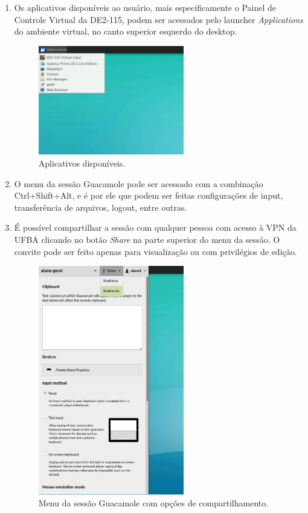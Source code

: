 \documentclass[12pt]{article}
\begin{document}
\begin{enumerate}[font=\bfseries]
    \item Os aplicativos disponíveis ao usuário, mais especificamente o Painel de Controle Virtual da DE2-115, podem ser acessados pelo launcher \textit{Applications} do ambiente virtual, no canto superior esquerdo do desktop.
    
    \begin{figure}[H]
    \centering
    \includegraphics[width=0.6\textwidth]{img/launcher-experimentos.jpg}
    \caption{\label{ref:launcher}Aplicativos disponíveis.}
    \end{figure}
    
    \item O menu da sessão Guacamole pode ser acessado com a combinação Ctrl+Shift+Alt, e é por ele que podem ser feitas configurações de input, transferência de arquivos, logout, entre outras.
    
    \item É possível compartilhar a sessão com qualquer pessoa com acesso à VPN da UFBA clicando no botão \textit{Share} na parte superior do menu da sessão. O convite pode ser feito apenas para visualização ou com privilégios de edição.
    
    \begin{figure}[H]
    \centering
    \includegraphics[width=0.6\textwidth]{img/share-guac.jpg}
    \caption{\label{ref:share-guac}Menu da sessão Guacamole com opções de compartilhamento.}
    \end{figure}
    

\end{enumerate}
\end{document}
